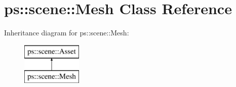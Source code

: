 \hypertarget{classps_1_1scene_1_1Mesh}{}\section{ps\+:\+:scene\+:\+:Mesh Class Reference}
\label{classps_1_1scene_1_1Mesh}
Inheritance diagram for ps\+:\+:scene\+:\+:Mesh\+:\begin{figure}[H]
\begin{center}
\leavevmode
\includegraphics[height=2.000000cm]{classps_1_1scene_1_1Mesh}
\end{center}
\end{figure}
